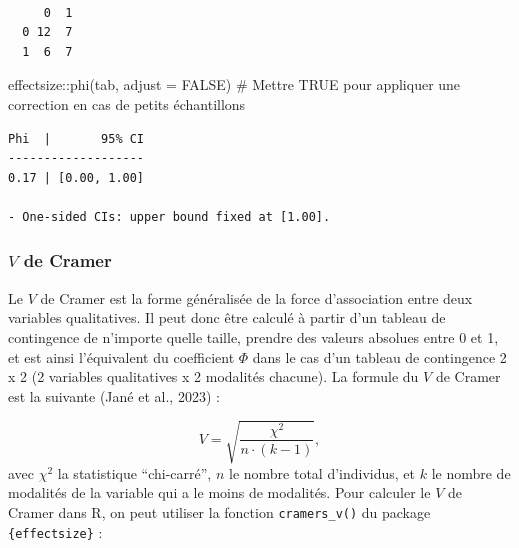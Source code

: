 \documentclass[
  letterpaper,
]{book}
\newenvironment{Shaded}{\begin{snugshade}}{\end{snugshade}}
\newcommand{\AttributeTok}[1]{\textcolor[rgb]{0.40,0.45,0.13}{#1}}
\newcommand{\CommentTok}[1]{\textcolor[rgb]{0.37,0.37,0.37}{#1}}
\newcommand{\ConstantTok}[1]{\textcolor[rgb]{0.56,0.35,0.01}{#1}}
\newcommand{\FunctionTok}[1]{\textcolor[rgb]{0.28,0.35,0.67}{#1}}
\newcommand{\NormalTok}[1]{\textcolor[rgb]{0.00,0.23,0.31}{#1}}
\newcommand{\OtherTok}[1]{\textcolor[rgb]{0.00,0.23,0.31}{#1}}
\newcommand{\SpecialCharTok}[1]{\textcolor[rgb]{0.37,0.37,0.37}{#1}}
\begin{document}
\begin{Shaded}
\end{Shaded}

\begin{verbatim}
   
     0  1
  0 12  7
  1  6  7
\end{verbatim}

\begin{Shaded}
\begin{Highlighting}[]
\NormalTok{effectsize}\SpecialCharTok{::}\FunctionTok{phi}\NormalTok{(tab, }\AttributeTok{adjust =} \ConstantTok{FALSE}\NormalTok{) }\CommentTok{\# Mettre TRUE pour appliquer une correction en cas de petits échantillons}
\end{Highlighting}
\end{Shaded}

\begin{verbatim}
Phi  |       95% CI
-------------------
0.17 | [0.00, 1.00]

- One-sided CIs: upper bound fixed at [1.00].
\end{verbatim}

\subsubsection{\texorpdfstring{\(V\) de
Cramer}{V de Cramer}}\label{v-de-cramer}

Le \(V\) de Cramer est la forme généralisée de la force d'association
entre deux variables qualitatives. Il peut donc être calculé à partir
d'un tableau de contingence de n'importe quelle taille, prendre des
valeurs absolues entre 0 et 1, et est ainsi l'équivalent du coefficient
\(\Phi\) dans le cas d'un tableau de contingence 2 x 2 (2 variables
qualitatives x 2 modalités chacune). La formule du \(V\) de Cramer est
la suivante (Jané et al., 2023) :

\[V = \sqrt{\frac{\chi^2}{n \cdot (k-1)}},\] avec \(\chi^2\) la
statistique ``chi-carré'', \(n\) le nombre total d'individus, et \(k\)
le nombre de modalités de la variable qui a le moins de modalités. Pour
calculer le \(V\) de Cramer dans R, on peut utiliser la fonction
\texttt{cramers\_v()} du package \texttt{\{effectsize\}} :
\end{document}
